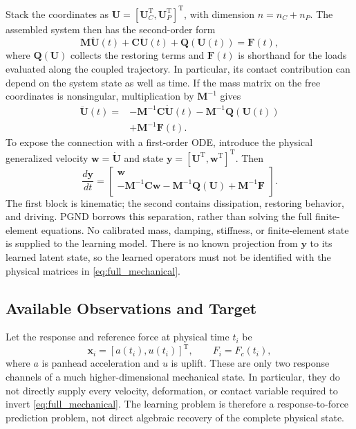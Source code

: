 \documentclass[journal,twoside]{IEEEtran}
\begin{document}
Stack the coordinates as
$\mathbf U=[\mathbf U_C^{\mathrm T},\mathbf U_P^{\mathrm T}]^{\mathrm T}$,
with dimension $n=n_C+n_P$. The assembled system then has the
second-order form
\begin{equation}
    \mathbf M\ddot{\mathbf U}(t)+\mathbf C\dot{\mathbf U}(t)
    +\mathbf Q(\mathbf U(t))=\mathbf F(t),
    \label{eq:full_mechanical}
\end{equation}
where $\mathbf Q(\mathbf U)$ collects the restoring terms and
$\mathbf F(t)$ is shorthand for the loads evaluated along the coupled
trajectory. In particular, its contact contribution can depend on the
system state as well as time. If the mass matrix on the free coordinates
is nonsingular, multiplication by $\mathbf M^{-1}$ gives
\begin{equation}
\begin{aligned}
    \ddot{\mathbf U}(t)={}&-\mathbf M^{-1}\mathbf C\dot{\mathbf U}(t)
    -\mathbf M^{-1}\mathbf Q(\mathbf U(t))\\
    &+\mathbf M^{-1}\mathbf F(t).
\end{aligned}
\label{eq:full_acceleration}
\end{equation}
To expose the connection with a first-order ODE, introduce the physical
generalized velocity $\mathbf w=\dot{\mathbf U}$ and state
$\mathbf y=[\mathbf U^{\mathrm T},\mathbf w^{\mathrm T}]^{\mathrm T}$.
Then
\begin{equation}
    \frac{d\mathbf y}{dt}=
    \begin{bmatrix}
        \mathbf w\\
        -\mathbf M^{-1}\mathbf C\mathbf w
        -\mathbf M^{-1}\mathbf Q(\mathbf U)
        +\mathbf M^{-1}\mathbf F
    \end{bmatrix}.
    \label{eq:mechanical_first_order}
\end{equation}
The first block is kinematic; the second contains dissipation, restoring
behavior, and driving. PGND borrows this separation, rather than solving
the full finite-element equations. No calibrated mass, damping, stiffness,
or finite-element state is supplied to the learning model. There is no
known projection from $\mathbf y$ to its learned latent state, so the
learned operators must not be identified with the physical matrices in
\eqref{eq:full_mechanical}.

\subsection{Available Observations and Target}
Let the response and reference force at physical time $t_i$ be
\begin{equation}
    \mathbf x_i=[a(t_i),u(t_i)]^{\mathrm T},
    \qquad F_i=F_c(t_i),
    \label{eq:observation}
\end{equation}
where $a$ is panhead acceleration and $u$ is uplift. These are only two
response channels of a much higher-dimensional mechanical state. In
particular, they do not directly supply every velocity, deformation, or
contact variable required to invert \eqref{eq:full_mechanical}. The
learning problem is therefore a response-to-force prediction problem,
not direct algebraic recovery of the complete physical state.
\end{document}
